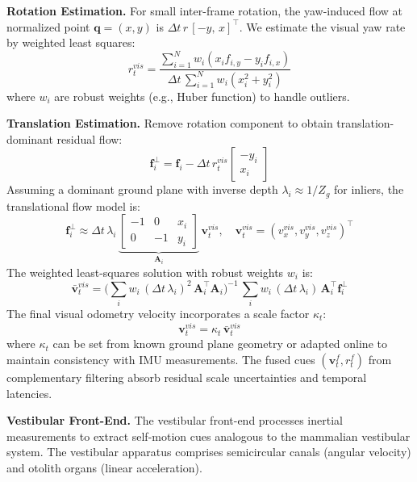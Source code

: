 \textbf{Rotation Estimation.} For small inter-frame rotation, the yaw-induced flow at normalized point $\mathbf{q}=(x,y)$ is $\Delta t\,r\,[-y,\,x]^\top$. We estimate the visual yaw rate by weighted least squares:
\begin{equation}
    r^{vis}_t=\frac{\sum_{i=1}^N w_i(x_i f_{i,y}-y_i f_{i,x})}{\Delta t\,\sum_{i=1}^N w_i(x_i^2+y_i^2)}
\end{equation}
where $w_i$ are robust weights (e.g., Huber function) to handle outliers.

\textbf{Translation Estimation.} Remove rotation component to obtain trans\-la\-tion-dom\-i\-nant residual flow:
\begin{equation}
    \mathbf{f}_i^{\perp}=\mathbf{f}_i-\Delta t\,r^{vis}_t\begin{bmatrix}-y_i\\ x_i\end{bmatrix}
\end{equation}
Assuming a dominant ground plane with inverse depth $\lambda_i\approx 1/Z_g$ for inliers, the translational flow model is:
\begin{equation}
    \mathbf{f}_i^{\perp}\approx \Delta t\,\lambda_i\,\underbrace{\begin{bmatrix}-1 & 0 & x_i\\ 0 & -1 & y_i\end{bmatrix}}_{\mathbf{A}_i}\,\mathbf{v}^{vis}_t,\quad \mathbf{v}^{vis}_t=(v_x^{vis}, v_y^{vis}, v_z^{vis})^\top
\end{equation}
The weighted least-squares solution with robust weights $w_i$ is:
\begin{equation}
    \bar{\mathbf{v}}^{vis}_t=\Big(\sum_i w_i\,(\Delta t\,\lambda_i)^2\,\mathbf{A}_i^\top\mathbf{A}_i\Big)^{-1}\,\sum_i w_i\,(\Delta t\,\lambda_i)\,\mathbf{A}_i^\top\mathbf{f}_i^{\perp}
\end{equation}
The final visual odometry velocity incorporates a scale factor $\kappa_t$:
\begin{equation}
    \mathbf{v}^{vis}_t=\kappa_t\,\bar{\mathbf{v}}^{vis}_t
\end{equation}
where $\kappa_t$ can be set from known ground plane geometry or adapted online to maintain consistency with IMU measurements. The fused cues $(\mathbf{v}^{f}_t, r^{f}_t)$ from complementary filtering absorb residual scale uncertainties and temporal latencies.

\textbf{Ves\-tib\-u\-lar Front-End.} The ves\-tib\-u\-lar front-end processes inertial measurements to extract self-motion cues analogous to the mammalian ves\-tib\-u\-lar system. The ves\-tib\-u\-lar apparatus comprises semicircular canals (angular velocity) and otolith organs (linear acceleration).

